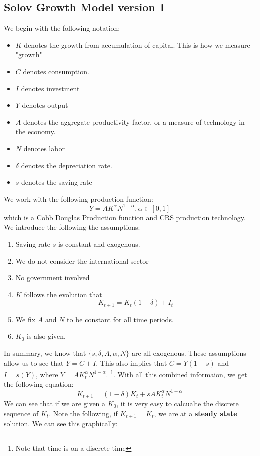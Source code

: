 \documentclass[11pt]{article}
\begin{document}
\subsection{Solov Growth Model version 1}
We begin with the following notation:
\begin{itemize}
    \item $K$ denotes the growth from accumulation of capital. This is how we measure "growth"
    \item $C$ denotes consumption. 
    \item $I$ denotes investment
    \item $Y$ denotes output
    \item $A$ denotes the aggregate productivity factor, or a measure of technology in the economy. 
    \item $N$ denotes labor 
    \item $\delta$ denotes the depreciation rate. 
    \item $s$ denotes the saving rate
\end{itemize}
We work with the following production function:
\[
Y = AK^\alpha N^{1-\alpha}, \alpha \in [0,1]
\]
which is a Cobb Douglas Production function and CRS production technology. We introduce the following the assumptions:
\begin{enumerate}
    \item Saving rate $s$ is constant and exogenous. 
    \item We do not consider the international sector 
    \item No government involved 
    \item $K$ follows the evolution that \[K_{t+1}= K_t(1-\delta) + I_t\]
    \item We fix $A$ and $N$ to be constant for all time periods. 
    \item $K_0$ is also given. 
\end{enumerate}
In summary, we know that $\{s, \delta, A, \alpha, N\}$ are all exogenous. 
These assumptions allow us to see that $Y = C + I$. This also implies that $C = Y(1-s)$ and $I = s(Y)$, where $Y = A K^\alpha_t N^{1-\alpha}$. \footnote{Note that time is on a discrete time}. With all this combined informaion, we get the following equation:
\[
K_{t+1} = (1-\delta) K_t + sA K^\alpha_t N^{1-\alpha}
\]
We can see that if we are given a $K_0$, it is very easy to calcualte the discrete sequence of $K_t$.
Note the following, if $K_{t+1} = K_t$, we are at a \textbf{steady state} solution. We can see this graphically: 
\end{document}
